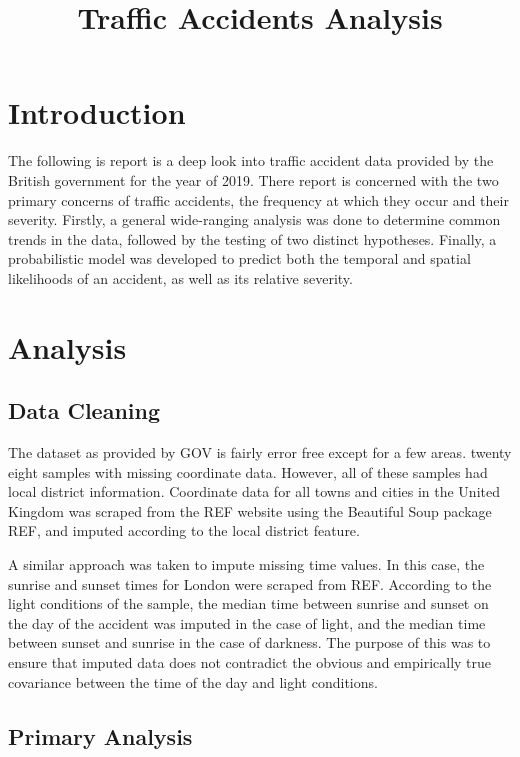 \documentclass[12pt]{article}
\title{Traffic Accidents Analysis}
\date{}
\begin{document}
\maketitle



\section{Introduction}

The following is report is a deep look into traffic accident data provided by the British government for the year of 2019. There report is concerned with the two primary concerns of traffic accidents, the frequency at which they occur and their severity. Firstly, a general wide-ranging analysis was done to determine common trends in the data, followed by the testing of two distinct hypotheses. Finally, a probabilistic model was developed to predict both the temporal and spatial likelihoods of an accident, as well as its relative severity.

\section{Analysis}

\subsection{Data Cleaning}

The dataset as provided by GOV is fairly error free except for a few areas. twenty eight samples with missing coordinate data. However, all of these samples had local district information. Coordinate data for all towns and cities in the United Kingdom was scraped from the REF website using the Beautiful Soup package REF, and imputed according to the local district feature. 

A similar approach was taken to impute missing time values. In this case, the sunrise and sunset times for London were scraped from REF. According to the light conditions of the sample, the median time between sunrise and sunset on the day of the accident was imputed in the case of light, and the median time between sunset and sunrise in the case of darkness. The purpose of this was to ensure that imputed data does not contradict the obvious and empirically true covariance between the time of the day and light conditions.

\subsection{Primary Analysis}
\end{document}
